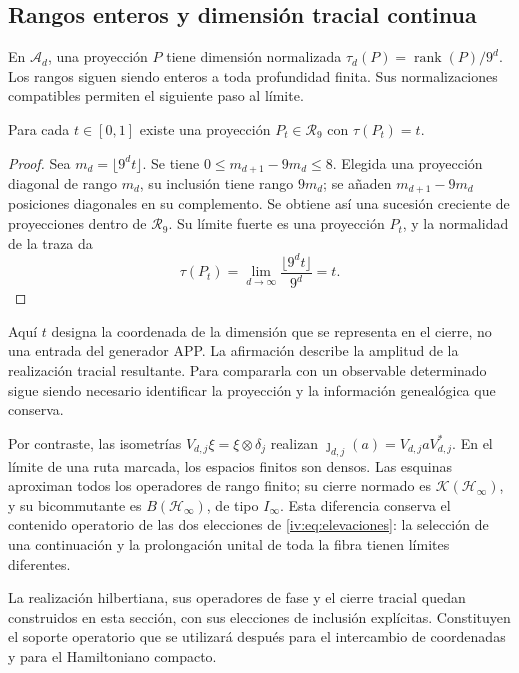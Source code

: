 \subsection{Rangos enteros y dimensión tracial continua}

En \(\mathcal A_d\), una proyección \(P\) tiene dimensión
normalizada \(\tau_d(P)=\operatorname{rank}(P)/9^d\).
Los rangos siguen siendo enteros a toda profundidad finita. Sus
normalizaciones compatibles permiten el siguiente paso al límite.

\begin{proposition}
\label{iv:prop:dimension-tracial}
Para cada \(t\in[0,1]\) existe una proyección
\(P_t\in\mathcal R_9\) con \(\tau(P_t)=t\).
\end{proposition}
\begin{proof}
Sea \(m_d=\lfloor9^dt\rfloor\). Se tiene
\(0\leq m_{d+1}-9m_d\leq8\). Elegida una proyección diagonal
de rango \(m_d\), su inclusión tiene rango \(9m_d\); se
añaden \(m_{d+1}-9m_d\) posiciones diagonales en su complemento.
Se obtiene así una sucesión creciente de proyecciones dentro de
\(\mathcal R_9\). Su límite fuerte es una proyección \(P_t\),
y la normalidad de la traza da
\[
 \tau(P_t)=\lim_{d\to\infty}\frac{\lfloor9^dt\rfloor}{9^d}=t.
\]
\end{proof}

Aquí \(t\) designa la coordenada de la dimensión que se representa
en el cierre, no una entrada del generador APP. La afirmación
describe la amplitud de la realización tracial resultante. Para
compararla con un observable determinado sigue siendo necesario
identificar la proyección y la información genealógica que conserva.

Por contraste, las isometrías
\(V_{d,j}\xi=\xi\otimes\delta_j\) realizan
\(\jmath_{d,j}(a)=V_{d,j}aV_{d,j}^*\). En el límite de una
ruta marcada, los espacios finitos son densos. Las esquinas
aproximan todos los operadores de rango finito; su cierre normado
es \(\mathcal K(\mathcal H_\infty)\), y su bicommutante es
\(B(\mathcal H_\infty)\), de tipo \(I_\infty\). Esta
diferencia conserva el contenido operatorio de las dos elecciones
de \eqref{iv:eq:elevaciones}: la selección de una continuación y
la prolongación unital de toda la fibra tienen límites diferentes.

La realización hilbertiana, sus operadores de fase y el cierre
tracial quedan construidos en esta sección, con sus elecciones de
inclusión explícitas. Constituyen el
soporte operatorio que se utilizará después para el intercambio de
coordenadas y para el Hamiltoniano compacto.
